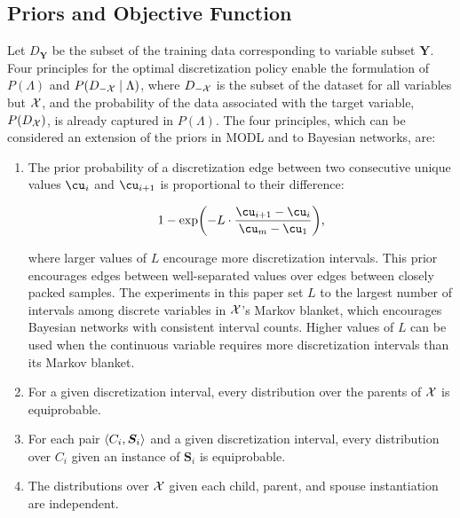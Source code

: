 

\subsection{Priors and Objective Function}

Let $D_{\bm{Y}}$ be the subset of the training data corresponding to variable subset $\bm{Y}$.
Four principles for the optimal discretization policy enable the formulation of $P(\Lambda)$ and $P(D_{-\mathcal{X}} \mid \Lambda)$, where $D_{-\mathcal{X}}$ is the subset of the dataset for all variables but $\mathcal{X}$, and the probability of the data associated with the target variable, $P(D_{\mathcal{X}})$, is already captured in $P(\Lambda)$.
The four principles, which can be considered an extension of the priors in MODL and \cite{Lustgarten_2011} to Bayesian networks, are:

\begin{enumerate}
\item The prior probability of a discretization edge between two consecutive unique values $\cu_i$ and $\cu_{i+1}$ is proportional to their difference:

  \begin{equation}
  1 - \exp \paren{- L \cdot \frac{\cu_{i+1} - \cu_i}{\cu_m - \cu_1}}\text{,}
  \end{equation}

where larger values of $L$ encourage more discretization intervals.
This prior encourages edges between well-separated values over edges between closely packed samples.
The experiments in this paper set $L$ to the largest number of intervals among discrete variables in $\mathcal{X}$'s Markov blanket, which encourages Bayesian networks with consistent interval counts.
Higher values of $L$ can be used when the continuous variable requires more discretization intervals than its Markov blanket.

\item For a given discretization interval, every distribution over the parents of $\mathcal{X}$ is equiprobable.
\item For each pair $\langle C_i,\bm{S}_i \rangle$ and a given discretization interval, every distribution over $C_i$ given an instance of $\bm{S}_i$ is equiprobable.
\item The distributions over $\mathcal{X}$ given each child, parent, and spouse instantiation are independent.
\end{enumerate}


